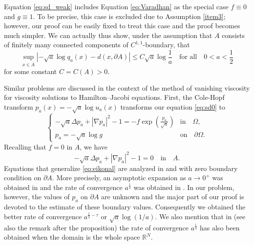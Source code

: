\documentclass[graybox]{svmult}
\newcommand{\R}{\mathbb{R}}  %
\renewcommand{\AA}{A}  %
\begin{document}
\begin{remark} Equation \eqref{eq:sd_weak} includes Equation \eqref{eq:Varadhan} as the special case $f\equiv 0$ and $g\equiv1$. To be precise, this case is excluded due to Assumption \ref{item3}; however, our proof can be easily fixed to treat this case and the proof becomes much simpler. We can actually thus show, under the assumption that $\AA$ consists of finitely many connected components of $C^{1,1}$-boundary, that 
\begin{equation*}%
\sup_{x\in \overline{\AA}} \left| -\sqrt{a} \log q_a(x) - d(x, \partial \AA)\right| \le C\sqrt{a}\log\frac1{a} \quad \text{for all} \quad 0<a<\frac1{2}  
\end{equation*}
for some constant $C=C(\AA)>0$. 
\end{remark}

\begin{remark}
Similar problems are discussed in the context of the method of vanishing viscosity for viscosity solutions to Hamilton--Jacobi equations. 
First, the Cole-Hopf transform $p_a(x) = -\sqrt{a} \log u_a(x)$ transforms our equation \eqref{eq:sd0} to  
\begin{equation*}
\begin{cases}
-\sqrt{a}\Delta p_a+|\nabla p_a|^2-1 =-f\exp(\frac{p_a}{\sqrt{a}})& \text{in}\quad \Omega, \\
p_a = -\sqrt{a}\log g & \text{on} \quad  \partial \Omega. 
\end{cases}
\end{equation*}
Recalling that $f=0$ in $A$, we have   
 \begin{equation}\label{eq:eikonal}
-\sqrt{a}\Delta p_a+|\nabla p_a|^2-1 =0 \quad \text{in} \quad A. 
\end{equation}
Equations that generalize \eqref{eq:eikonal} are analyzed in \cite{FS86} and \cite{Tra11} with zero boundary condition on $\partial A$. More precisely,  an asymptotic expansion as $a\to0^+$ was obtained in \cite[Theorem 5.1]{FS86} and  the rate of convergence $a^{\frac1{4}}$ was obtained in \cite[Theorem 3.3]{Tra11}. In our problem, however, the  values of $p_a$ on $\partial A$ are unknown and the major part of our proof is devoted to the estimate of these boundary values. Consequently we obtained the better rate of convergence $a^{\frac{1}{2}-\tau}$ or $\sqrt{a}\log(1/a)$. 
We also mention that in \cite[Proposition 6.1]{L} (see also the remark after the proposition) the rate of convergence $a^{\frac1{4}}$ has also been obtained when the domain is the whole space $\R^N$.
\end{remark}
\end{document}
